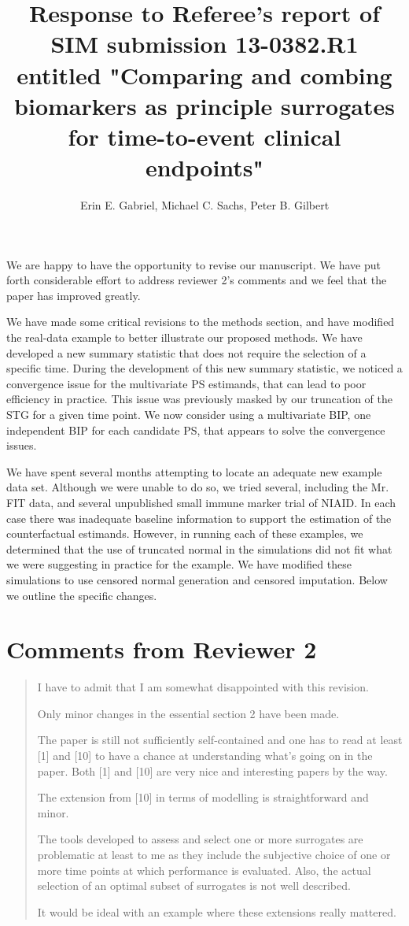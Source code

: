 \documentclass[11pt]{article} %
\title{Response to Referee’s report of SIM submission 13-0382.R1 entitled "Comparing and
combing biomarkers as principle surrogates for time-to-event clinical
endpoints"}
\author{Erin E. Gabriel, Michael C. Sachs, Peter B. Gilbert}
\begin{document}
\maketitle
We are happy to have the opportunity to revise our manuscript. We have put forth considerable effort to address reviewer 2's comments and we feel that the paper has improved greatly. 

We have made some critical revisions to the methods section, and have modified the real-data example to better illustrate our proposed methods.  We have developed a new summary statistic that does not require the selection of a specific time. During the development of this new summary statistic, we noticed a convergence issue for the multivariate PS estimands, that can lead to poor efficiency in practice. This issue was previously masked by our truncation of the STG for a given time point. We now consider using a multivariate BIP, one independent BIP for each candidate PS, that appears to solve the convergence issues. 

We have spent several months attempting to locate an adequate new example data set. Although we were unable to do so, we tried several, including the Mr. FIT data, and several unpublished small immune marker trial of NIAID. In each case there was inadequate baseline information to support the estimation of the counterfactual estimands. However, in running each of these examples, we determined that the use of truncated normal in the simulations did not fit what we were suggesting in practice for the example. We have modified these simulations to use censored normal generation and censored imputation. Below we outline the specific changes. 


\section{Comments from Reviewer 2}
\begin{quotation}
I have to admit that I am somewhat disappointed with this revision.

Only minor changes in the essential section 2 have been made.

The paper is still not sufficiently self-contained and one has to read at least [1] and [10] to have a chance at understanding what’s going on in the paper. Both [1] and [10] are very nice and interesting papers by the way.

The extension from [10] in terms of modelling is straightforward and minor.

The tools developed to assess and select one or more surrogates are problematic at least to me as they include the subjective choice of one or more time points at which performance is evaluated. Also, the actual selection of an optimal subset of surrogates is not well described.

It would be ideal with an example where these extensions really mattered.
\end{quotation}
\end{document}
